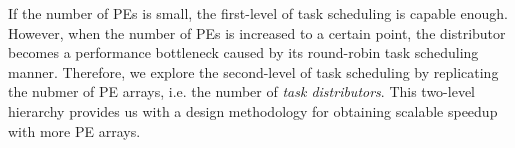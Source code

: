 If the number of PEs is small, the first-level of task scheduling is capable enough. 
However, when the number of PEs is increased to a certain point, 
the distributor becomes a performance bottleneck caused by its round-robin task scheduling manner.
Therefore, we explore the second-level of task scheduling by replicating the nubmer of PE arrays, i.e. the number of \textit{task distributors}. 
This two-level hierarchy provides us with a design methodology for obtaining scalable speedup with more PE arrays.
